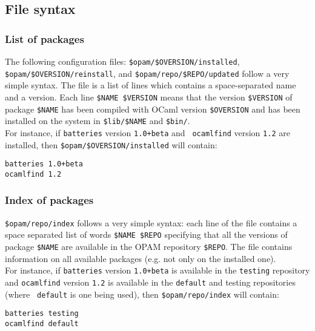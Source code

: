 \documentclass[a4paper,11pt]{article}
\begin{document}
\subsection{File syntax}

\subsubsection{List of packages}
\label{installed}

The following configuration files: \verb+$opam/$OVERSION/installed+,
\verb+$opam/$OVERSION/reinstall+, and \verb+$opam/repo/$REPO/updated+
follow a very simple syntax. The file is a list of lines which
contains a space-separated name and a version. Each line
\verb+$NAME $VERSION+ means that the version \verb+$VERSION+ of
package \verb+$NAME+ has been compiled with OCaml version
\verb+$OVERSION+ and has been installed on the system in
\verb+$lib/$NAME+ and \verb+$bin/+. \\

For instance, if {\tt batteries} version {\tt 1.0+beta} and {\tt
  ocamlfind} version {\tt 1.2} are installed, then
\verb+$opam/$OVERSION/installed+ will contain:

{\small
\begin{Verbatim}[frame=single]
batteries 1.0+beta
ocamlfind 1.2
\end{Verbatim}
}

\subsubsection{Index of packages}
\label{index}

\verb+$opam/repo/index+ follows a very simple syntax: each line of the
file contains a space separated list of words \verb+$NAME $REPO+
specifying that all the versions of package \verb+$NAME+ are available
in the OPAM repository \verb+$REPO+. The file contains information on
all available packages (e.g. not only on the installed one). \\

For instance, if {\tt batteries} version {\tt 1.0+beta} is available
in the {\tt testing} repository and {\tt ocamlfind} version {\tt 1.2}
is available in the {\tt default} and testing repositories (where {\tt
  default} is one being used), then \verb+$opam/repo/index+ will
contain:

{\small
\begin{Verbatim}[frame=single]
batteries testing
ocamlfind default
\end{Verbatim}
}
\end{document}

